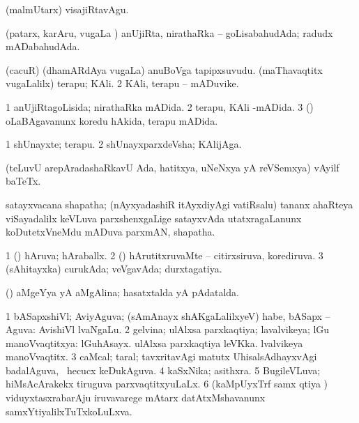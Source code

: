 {{{{{{{{{{{{\noindent 
\gl{\akirx}
\expl{}
\bmng
 (malmUtarx) visajiRtavAgu. 
\emng
\eentry

\bentry 
{} 
\gl{\gu}
\expl{}
\bmng
 (patarx, karAru, \mo vugaLa \vi) anUjiRta, nirathaRka -- goLisabahudAda; radudx mADabahudAda. 
\emng
\eentry

\bentry 
{} 
\gl{\nA}
\expl{}
\bmng
\bnum
{} 
\banum
{} (cacuR) (dhamARdAya \mo vugaLa) anuBoVga tapipxsuvudu. 
 (maThavaqtitx \mo vugaLalilx) terapu; KAli. 
\eanum
\numie
\num{2} KAli, terapu -- mADuvike. 
\enum
\emng
\eentry

\bentry
{} 
\gl{\gu}
\expl{}
\bmng
\bnum
\num{1} anUjiRtagoLisida; nirathaRka mADida. 
\num{2} terapu, KAli -mADida. 
\num{3} (\vaMlAM) oLaBAgavanunx koredu hAkida, terapu mADida. 
\enum
\emng
\eentry

\bentry
{} 
\gl{\nA}
\expl{}
\bmng
\bnum
\num{1} shUnayxte; terapu. 
\num{2} shUnayxparxdeVsha; KAlijAga. 
\enum
\emng
\eentry

\bentry
{} 
\gl{\nA}
\expl{}
\bmng
 (teLuvU arepAradashaRkavU Ada, hatitxya, uNeNxya yA reVSemxya) vAyilf baTeTx. 
\emng
\eentry

\bentry 
{} 
\gl{\nA}
\expl{\F\ }
\bmng
satayxvacana shapatha; (nAyxyadashiR itAyxdiyAgi vatiRsalu) tananx ahaRteya viSayadalilx keVLuva parxshenxgaLige satayxvAda utatxragaLanunx koDutetxVneMdu mADuva parxmAN, shapatha. 
\emng
\eentry

\bentry 
{}
\gl{\saMkiSx}
\expl{}
\bmng
\emng
\eentry

\bentry 
{} 
\gl{\gu}
\expl{}
\bmng
\bnum
\num{1} (\pArxvi) hAruva; hAraballx. 
\num{2} (\vaMlAM) hArutitxruvaMte -- citirxsiruva, korediruva. 
\num{3} (sAhitayxka) curukAda; veVgavAda; durxtagatiya. 
\enum
\emng
\eentry

\bentry
{} 
\gl{\gu}
\expl{}
\bmng
 (\aMrashA) aMgeYya yA aMgAlina; hasatxtalda yA pAdatalda. 
\emng
\eentry

\bentry 
{} 
\gl{\gu}
\expl{}
\bmng
\bnum
\num{1} bASapxshiVl; AviyAguva; (sAmAnayx shAKgaLalilxyeV) habe, bASapx -- Aguva:  AvishiVl lvaNgaLu. 
\num{2} gelvina; ulAlxsa parxkaqtiya; lavalvikeya; lGu manoVvaqtitxya:  lGuhAsayx.  ulAlxsa parxkaqtiya leVKka.  lvalvikeya manoVvaqtitx. 
\num{3} caMcal; taral; tavxritavAgi matutx UhisalsAdhayxvAgi badalAguva, \kanmu\ hecucx keDukAguva. 
\num{4} kaSxNika; asithxra. 
\num{5} BugileVLuva; hiMsAcArakekx tiruguva parxvaqtitxyuLaLx. 
\num{6} (kaMpUyxTrf samx qtiya \vi) viduyxtasxrabarAju iruvavarege mAtarx datAtxMshavanunx samxYtiyalilxTuTxkoLuLxva. 
\enum
\emng
\eentry

}}}}}}}}}}}}
